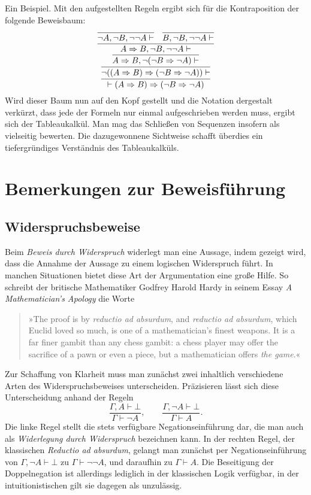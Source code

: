 Ein Beispiel. Mit den aufgestellten Regeln ergibt sich für die
Kontraposition der folgende Beweisbaum:
\[
\infer{\vdash (A\cond B)\cond (\lnot B\cond\lnot A)}{
  \infer{\lnot ((A\cond B)\cond (\lnot B\cond\lnot A))\vdash}{
    \infer{A\cond B, \lnot(\lnot B\cond\lnot A)\vdash}{
      \infer{A\cond B, \lnot B, \lnot\lnot A\vdash }{
        \infer{\lnot A, \lnot B, \lnot\lnot A\vdash}{}
      & \infer{B, \lnot B, \lnot\lnot A\vdash}{}}}}}
\]
Wird dieser Baum nun auf den Kopf gestellt und die Notation dergestalt
verkürzt, dass jede der Formeln nur einmal aufgeschrieben werden
muss, ergibt sich der Tableaukalkül. Man mag das Schließen von
Sequenzen insofern als vielseitig bewerten. Die dazugewonnene Sichtweise
schafft überdies ein tiefergründiges Verständnis des Tableaukalküls.

\section{Bemerkungen zur Beweisführung}

\subsection{Widerspruchsbeweise}

Beim \emph{Beweis durch Widerspruch} widerlegt man eine Aussage, indem
gezeigt wird, dass die Annahme der Aussage zu einem logischen
Widerspruch führt. In manchen Situationen bietet
diese Art der Argumentation eine große Hilfe. So schreibt der britische
Mathematiker Godfrey Harold Hardy in seinem Essay
\emph{A Mathematician's Apology} die Worte
\begin{quote}
»The proof is by \emph{reductio ad absurdum}, and \emph{reductio ad
absurdum}, which Euclid loved so much, is one of a mathematician's
finest weapons. It is a far finer gambit than any chess gambit: a chess
player may offer the sacrifice of a pawn or even a piece, but a
mathematician offers \emph{the game}.«
\end{quote}
Zur Schaffung von Klarheit muss man zunächst zwei inhaltlich
verschiedene Arten des Widerspruchsbeweises unterscheiden.
Präzisieren lässt sich diese Unterscheidung anhand
der Regeln
\[\dfrac{\Gamma,A\vdash\bot}{\Gamma\vdash\lnot A},\qquad
\dfrac{\Gamma,\lnot A\vdash\bot}{\Gamma\vdash A}.\]
Die linke Regel stellt die stets verfügbare Negationseinführung dar,
die man auch als \emph{Widerlegung durch Widerspruch} bezeichnen kann.
In der rechten Regel, der klassischen \emph{Reductio ad absurdum},
gelangt man zunächst per Negationseinführung von
$\Gamma,\lnot A\vdash\bot$ zu $\Gamma\vdash\lnot\lnot A$, und daraufhin
zu $\Gamma\vdash A$. Die Beseitigung der Doppelnegation%
 ist allerdings lediglich in der klassischen
Logik verfügbar, in der intuitionistischen gilt sie dagegen als
unzulässig.

